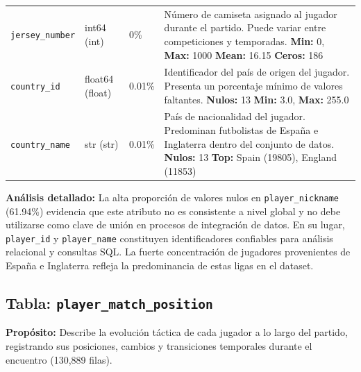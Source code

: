 \documentclass[12pt,a4paper]{article}
\begin{document}
\begin{center}
\begin{longtable}{T{3.5cm} C{2.5cm} C{1.5cm} p{7.0cm}}
\texttt{jersey\_number} & int64 \newline (int) & 0\% & Número de camiseta asignado al jugador durante el partido. Puede variar entre competiciones y temporadas. \newline \textbf{Min:} 0, \textbf{Max:} 1000 \newline \textbf{Mean:} 16.15 \newline \textbf{Ceros:} 186 \\

\texttt{country\_id} & float64 \newline (float) & \textcolor{orangenull}{0.01\%} & Identificador del país de origen del jugador. Presenta un porcentaje mínimo de valores faltantes. \newline \textbf{Nulos:} 13 \newline \textbf{Min:} 3.0, \textbf{Max:} 255.0 \\

\texttt{country\_name} & str \newline (str) & \textcolor{orangenull}{0.01\%} & País de nacionalidad del jugador. Predominan futbolistas de España e Inglaterra dentro del conjunto de datos. \newline \textbf{Nulos:} 13 \newline \textbf{Top:} Spain (19805), England (11853) \\

\bottomrule
\end{longtable}
\end{center}

\textbf{Análisis detallado:} 
La alta proporción de valores nulos en \texttt{player\_nickname} (61.94\%) evidencia que este atributo no es consistente a nivel global y no debe utilizarse como clave de unión en procesos de integración de datos. En su lugar, \texttt{player\_id} y \texttt{player\_name} constituyen identificadores confiables para análisis relacional y consultas SQL. La fuerte concentración de jugadores provenientes de España e Inglaterra refleja la predominancia de estas ligas en el dataset.
\subsection{Tabla: \texttt{player\_match\_position}}

\textbf{Propósito:} Describe la evolución táctica de cada jugador a lo largo del partido, registrando sus posiciones, cambios y transiciones temporales durante el encuentro (130,889 filas).
\end{document}
